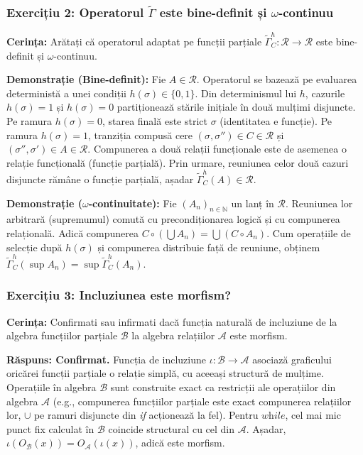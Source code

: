 \subsubsection{Exercițiu 2: Operatorul $\tilde{\Gamma}$ este bine-definit și $\omega$-continuu}
\textbf{Cerința:} Arătați că operatorul adaptat pe funcții parțiale $\tilde{\Gamma}_C^h : \mathcal{R} \to \mathcal{R}$ este bine-definit și $\omega$-continuu.

\textbf{Demonstrație (Bine-definit):} Fie $A \in \mathcal{R}$. Operatorul se bazează pe evaluarea deterministă a unei condiții $h(\sigma) \in \{0,1\}$. Din determinismul lui $h$, cazurile $h(\sigma)=1$ și $h(\sigma)=0$ partiționează stările inițiale în două mulțimi disjuncte. Pe ramura $h(\sigma)=0$, starea finală este strict $\sigma$ (identitatea e funcție). Pe ramura $h(\sigma)=1$, tranziția compusă cere $(\sigma, \sigma'') \in C \in \mathcal{R}$ și $(\sigma'', \sigma') \in A \in \mathcal{R}$. Compunerea a două relații funcționale este de asemenea o relație funcțională (funcție parțială). Prin urmare, reuniunea celor două cazuri disjuncte rămâne o funcție parțială, așadar $\tilde{\Gamma}_C^h(A) \in \mathcal{R}$.

\textbf{Demonstrație ($\omega$-continuitate):} Fie $(A_n)_{n \in \mathbb{N}}$ un lanț în $\mathcal{R}$. Reuniunea lor arbitrară (supremumul) comută cu precondiționarea logică și cu compunerea relațională. Adică compunerea $C \circ (\bigcup A_n) = \bigcup (C \circ A_n)$. Cum operațiile de selecție după $h(\sigma)$ și compunerea distribuie față de reuniune, obținem $\tilde{\Gamma}_C^h(\sup A_n) = \sup \tilde{\Gamma}_C^h(A_n)$.

\subsubsection{Exercițiu 3: Incluziunea este morfism?}
\textbf{Cerința:} Confirmati sau infirmati dacă funcția naturală de incluziune de la algebra funcțiilor parțiale $\mathcal{B}$ la algebra relațiilor $\mathcal{A}$ este morfism.

\textbf{Răspuns: Confirmat.}
Funcția de incluziune $\iota : \mathcal{B} \to \mathcal{A}$ asociază graficului oricărei funcții parțiale o relație simplă, cu aceeași structură de mulțime. Operațiile în algebra $\mathcal{B}$ sunt construite exact ca restricții ale operațiilor din algebra $\mathcal{A}$ (e.g., compunerea funcțiilor parțiale este exact compunerea relațiilor lor, $\cup$ pe ramuri disjuncte din \textit{if} acționează la fel). Pentru $\textit{while}$, cel mai mic punct fix calculat în $\mathcal{B}$ coincide structural cu cel din $\mathcal{A}$. Așadar, $\iota(O_{\mathcal{B}}(x)) = O_{\mathcal{A}}(\iota(x))$, adică este morfism.
